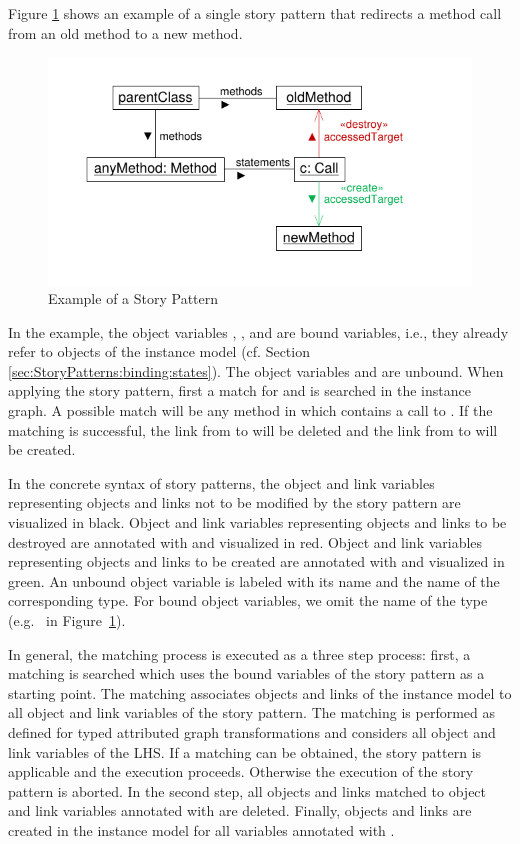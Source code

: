 Figure \ref{fig:simpleStoryPattern} shows an example of a single story pattern that redirects a method call from an old method to a new method.
\begin{figure}[htb]
  \centering
  \includegraphics[scale=1.0]{figures/SimpleStoryPattern}
  \caption{Example of a Story Pattern}
  \label{fig:simpleStoryPattern}
\end{figure}
In the example, the object variables , , and  are bound variables, i.e., they already refer to objects of the instance model (cf. Section \ref{sec:StoryPatterns:binding:states}).
The object variables  and  are unbound. 
When applying the story pattern, first a match for  and  is searched in the instance graph. 
A possible match will be any method in  which contains a call to . 
If the matching is successful, the link from  to  will be deleted and the link from  to  will be created.

In the concrete syntax of story patterns, the object and link variables representing objects and links not to be modified by the story pattern are visualized in black. 
Object and link variables representing objects and links to be destroyed are annotated with \destroy and visualized in red. 
Object and link variables representing objects and links to be created are annotated with \create and visualized in green. 
An unbound object variable is labeled with its name and the name of the corresponding type. 
For bound object variables, we omit the name of the type (e.g.\  in Figure~\ref{fig:simpleStoryPattern}).

In general, the matching process is executed as a three step process:
first, a matching is searched which uses the bound variables of the story pattern as a starting point. The matching associates objects and links of the instance model to all object and link variables of the story pattern. 
The matching is performed as defined for typed attributed graph transformations and considers all object and link variables of the LHS.
If a matching can be obtained, the story pattern is applicable and the execution proceeds. 
Otherwise the execution of the story pattern is aborted.
In the second step, all objects and links matched to object and link variables annotated with \destroy are deleted. 
Finally, objects and links are created in the instance model for all variables annotated with \create.

